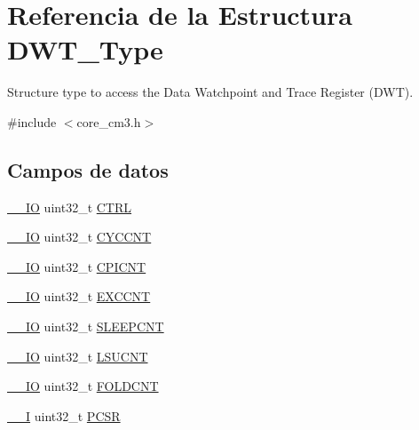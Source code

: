 \hypertarget{struct_d_w_t___type}{}\section{Referencia de la Estructura D\+W\+T\+\_\+\+Type}
\label{struct_d_w_t___type}


Structure type to access the Data Watchpoint and Trace Register (D\+WT).  




{\ttfamily \#include $<$core\+\_\+cm3.\+h$>$}

\subsection*{Campos de datos}
\begin{DoxyCompactItemize}
\item 
\mbox{\hyperlink{core__cm3_8h_aec43007d9998a0a0e01faede4133d6be}{\+\_\+\+\_\+\+IO}} uint32\+\_\+t \mbox{\hyperlink{struct_d_w_t___type_a15fc8d35f045f329b80c544bef35ff64}{C\+T\+RL}}
\item 
\mbox{\hyperlink{core__cm3_8h_aec43007d9998a0a0e01faede4133d6be}{\+\_\+\+\_\+\+IO}} uint32\+\_\+t \mbox{\hyperlink{struct_d_w_t___type_acf6d1c3e5f5cef92986fd9cfae5c7224}{C\+Y\+C\+C\+NT}}
\item 
\mbox{\hyperlink{core__cm3_8h_aec43007d9998a0a0e01faede4133d6be}{\+\_\+\+\_\+\+IO}} uint32\+\_\+t \mbox{\hyperlink{struct_d_w_t___type_a49a1dced8d644fa6f4128570f102212e}{C\+P\+I\+C\+NT}}
\item 
\mbox{\hyperlink{core__cm3_8h_aec43007d9998a0a0e01faede4133d6be}{\+\_\+\+\_\+\+IO}} uint32\+\_\+t \mbox{\hyperlink{struct_d_w_t___type_ae6edad4ef9f92b3ce206dac61621871a}{E\+X\+C\+C\+NT}}
\item 
\mbox{\hyperlink{core__cm3_8h_aec43007d9998a0a0e01faede4133d6be}{\+\_\+\+\_\+\+IO}} uint32\+\_\+t \mbox{\hyperlink{struct_d_w_t___type_a720f3795a53a8d8f275df636fee1aee7}{S\+L\+E\+E\+P\+C\+NT}}
\item 
\mbox{\hyperlink{core__cm3_8h_aec43007d9998a0a0e01faede4133d6be}{\+\_\+\+\_\+\+IO}} uint32\+\_\+t \mbox{\hyperlink{struct_d_w_t___type_ab1d62b8e1a69bead9717d5a02f741811}{L\+S\+U\+C\+NT}}
\item 
\mbox{\hyperlink{core__cm3_8h_aec43007d9998a0a0e01faede4133d6be}{\+\_\+\+\_\+\+IO}} uint32\+\_\+t \mbox{\hyperlink{struct_d_w_t___type_a11e6aebbf2c7bedc29059ff023891b82}{F\+O\+L\+D\+C\+NT}}
\item 
\mbox{\hyperlink{core__cm3_8h_af63697ed9952cc71e1225efe205f6cd3}{\+\_\+\+\_\+I}} uint32\+\_\+t \mbox{\hyperlink{struct_d_w_t___type_accef6b622c8a41342ed32345b0922bea}{P\+C\+SR}}

\end{DoxyCompactItemize}
